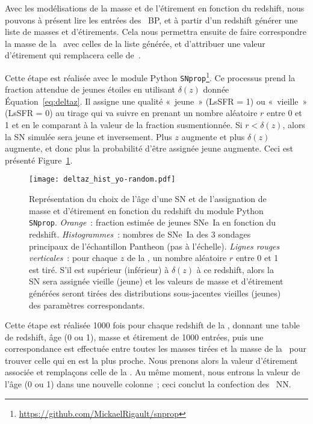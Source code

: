 \documentclass[../main/main.tex]{subfiles}
\begin{document}
Avec les modélisations de la masse et de l'étirement en fonction du redshift,
nous pouvons à présent lire les entrées des \hostlib\ BP, et à partir d'un
redshift générer une liste de masses et d'étirements. Cela nous permettra
ensuite de faire correspondre la masse de la \hostlib\ avec celles de la liste
générée, et d'attribuer une valeur d'étirement qui remplacera celle
de~.

Cette étape est réalisée avec le module Python
\texttt{SNprop}\footnote{\label{fn:snprop}\href{
    https://github.com/MickaelRigault/snprop}
{https://github.com/MickaelRigault/snprop}}. Ce processus prend la fraction
attendue de jeunes étoiles en utilisant $\delta(z)$ donnée
Équation~\ref{eq:deltaz}. Il assigne une qualité «~jeune~» (LsSFR = 1) ou
«~vieille~» (LsSFR = 0) au tirage qui va suivre en prenant un nombre aléatoire
$r$ entre 0 et 1 et en le comparant à la valeur de la fraction susmentionnée. Si
$r < \delta(z)$, alors la SN simulée sera jeune et inversement. Plus $z$
augmente et plus $\delta(z)$ augmente, et donc plus la probabilité d'être
assignée jeune augmente. Ceci est présenté Figure~\ref{fig:deltaz_rand}.

\begin{figure}[]
    \centering
    \texttt{[image: deltaz\_hist\_yo-random.pdf]}
    \caption[Représentation du choix de l'âge d'une SN et de l'assignation de
    masse et d'étirement en fonction du redshift]{Représentation du choix de
        l'âge d'une SN et de l'assignation de masse et d'étirement en fonction
        du redshift du module Python \texttt{SNprop}.
        \textit{Orange}~: fraction estimée de jeunes SNe~Ia en fonction du
        redshift. \textit{Histogrammes}~: nombres de SNe~Ia des 3 sondages
        principaux de l'échantillon Pantheon \citep{scolnic2018} (pas à
        l'échelle). \textit{Lignes rouges verticales}~: pour chaque $z$ de la
        \hostlib, un nombre aléatoire $r$ entre 0 et 1 est tiré. S'il est
        supérieur (inférieur) à $\delta(z)$ à ce redshift, alors la SN sera
        assignée vieille (jeune) et les valeurs de masse et d'étirement générées
        seront tirées des distributions sous-jacentes vieilles (jeunes) des
    paramètres correspondants.}
    \label{fig:deltaz_rand}
\end{figure}

Cette étape est réalisée \num{1000} fois pour chaque redshift de la \hostlib,
donnant une table de redshift, âge (0 ou 1), masse et étirement de \num{1000}
entrées, puis une correspondance est effectuée entre toutes les masses tirées et
la masse de la \hostlib\ pour trouver celle qui en est la plus proche. Nous
prenons alors la valeur d'étirement associée et remplaçons celle de la \hostlib.
Au même moment, nous entrons la valeur de l'âge (0 ou 1) dans une nouvelle
colonne~; ceci conclut la confection des \hostlib\ NN.
\end{document}
